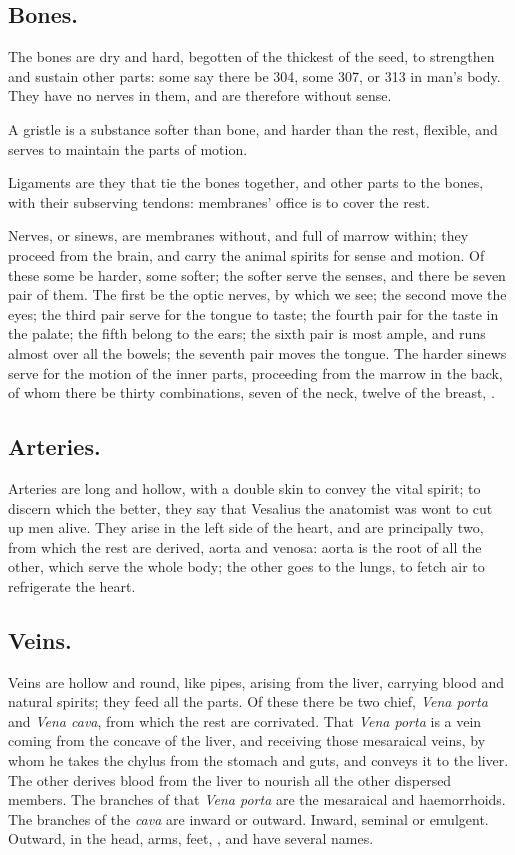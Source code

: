 {\subsection{Bones.}
The bones are dry and hard, begotten of the thickest of the
seed, to strengthen and sustain other parts: some say there be 304,
some 307, or 313 in man's body. They have no nerves in them, and are
therefore without sense.

A gristle is a substance softer than bone, and harder than the rest,
flexible, and serves to maintain the parts of motion.

Ligaments are they that tie the bones together, and other parts to the
bones, with their subserving tendons: membranes' office is to cover the
rest.

Nerves, or sinews, are membranes without, and full of marrow within;
they proceed from the brain, and carry the animal spirits for sense and
motion. Of these some be harder, some softer; the softer serve the
senses, and there be seven pair of them. The first be the optic nerves,
by which we see; the second move the eyes; the third pair serve for the
tongue to taste; the fourth pair for the taste in the palate; the fifth
belong to the ears; the sixth pair is most ample, and runs almost over
all the bowels; the seventh pair moves the tongue. The harder sinews
serve for the motion of the inner parts, proceeding from the marrow in
the back, of whom there be thirty combinations, seven of the neck,
twelve of the breast, \etc{}.

\subsection{Arteries.}
Arteries are long and hollow, with a double skin to convey
the vital spirit; to discern which the better, they say that Vesalius
the anatomist was wont to cut up men alive. They arise in the left
side of the heart, and are principally two, from which the rest are
derived, aorta and venosa: aorta is the root of all the other, which
serve the whole body; the other goes to the lungs, to fetch air to
refrigerate the heart.

\subsection{Veins.}
Veins are hollow and round, like pipes, arising from the
liver, carrying blood and natural spirits; they feed all the parts. Of
these there be two chief, \emph{Vena porta} and \emph{Vena cava}, from which the
rest are corrivated. That \emph{Vena porta} is a vein coming from the
concave of the liver, and receiving those mesaraical veins, by whom he
takes the chylus from the stomach and guts, and conveys it to the
liver. The other derives blood from the liver to nourish all the other
dispersed members. The branches of that \emph{Vena porta} are the mesaraical
and haemorrhoids. The branches of the \emph{cava} are inward or outward.
Inward, seminal or emulgent. Outward, in the head, arms, feet, \etc{}, and
have several names.

}
